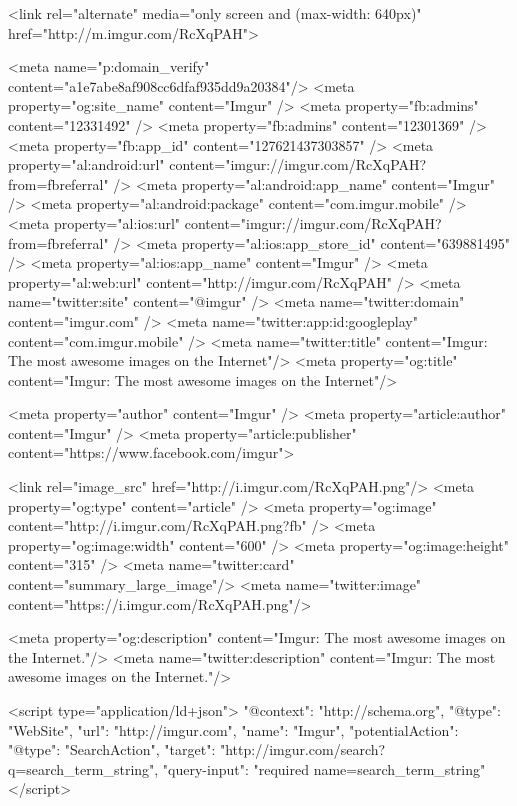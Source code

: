                 <link rel="alternate" media="only screen and (max-width: 640px)" href="http://m.imgur.com/RcXqPAH">
    

    <meta name="p:domain_verify" content="a1e7abe8af908cc6dfaf935dd9a20384"/>
    <meta property="og:site_name" content="Imgur" />
    <meta property="fb:admins" content="12331492" />
    <meta property="fb:admins" content="12301369" />
    <meta property="fb:app_id" content="127621437303857" />
    <meta property="al:android:url" content="imgur://imgur.com/RcXqPAH?from=fbreferral" />
    <meta property="al:android:app_name" content="Imgur" />
    <meta property="al:android:package" content="com.imgur.mobile" />
    <meta property="al:ios:url" content="imgur://imgur.com/RcXqPAH?from=fbreferral" />
    <meta property="al:ios:app_store_id" content="639881495" />
    <meta property="al:ios:app_name" content="Imgur" />
    <meta property="al:web:url" content="http://imgur.com/RcXqPAH" />
    <meta name="twitter:site" content="@imgur" />
    <meta name="twitter:domain" content="imgur.com" />
    <meta name="twitter:app:id:googleplay" content="com.imgur.mobile" />
                <meta name="twitter:title" content="Imgur: The most awesome images on the Internet"/>
        <meta property="og:title" content="Imgur: The most awesome images on the Internet"/>
    

    <meta property="author" content="Imgur" />
    <meta property="article:author" content="Imgur" />
    <meta property="article:publisher" content="https://www.facebook.com/imgur">

    

                        <link rel="image_src"            href="http://i.imgur.com/RcXqPAH.png"/>
            <meta property="og:type"         content="article" />
            <meta property="og:image"        content="http://i.imgur.com/RcXqPAH.png?fb" />
            <meta property="og:image:width"  content="600" />
            <meta property="og:image:height" content="315" />
            <meta name="twitter:card"        content="summary_large_image"/>
            <meta name="twitter:image"       content="https://i.imgur.com/RcXqPAH.png"/>
        
    

            <meta property="og:description" content="Imgur: The most awesome images on the Internet."/>
        <meta name="twitter:description" content="Imgur: The most awesome images on the Internet."/>
    

    
    <script type="application/ld+json">
        {
            "@context": "http://schema.org",
            "@type": "WebSite",
            "url": "http://imgur.com",
            "name": "Imgur",
            "potentialAction": {
                "@type": "SearchAction",
                "target": "http://imgur.com/search?q={search_term_string}",
                "query-input": "required name=search_term_string"
            }
        }
    </script>
    
